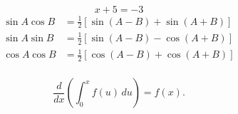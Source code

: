 \documentclass[12pt]{article}
\begin{document}
       	\[
       		x + 5 = -3
   		\]
          \begin{align*}
          \sin A \cos B &= \frac{1}{2}\left[ \sin(A-B)+\sin(A+B) \right] \\
          \sin A \sin B &= \frac{1}{2}\left[ \sin(A-B)-\cos(A+B) \right] \\
          \cos A \cos B &= \frac{1}{2}\left[ \cos(A-B)+\cos(A+B) \right] \\
          \end{align*}
          
            \[
        		\frac{d}{dx}\left( \int_{0}^{x} f(u)\,du\right)=f(x).
     		\]
       
\end{document}

